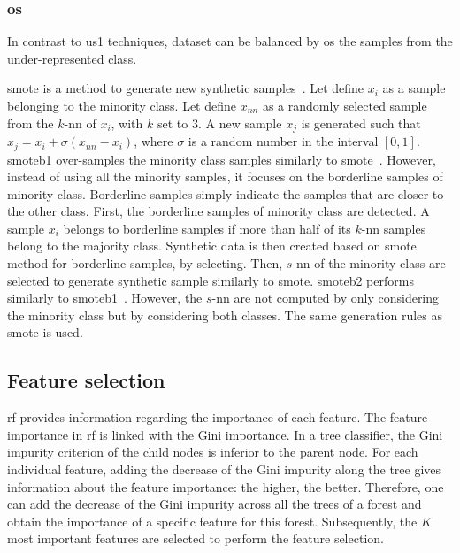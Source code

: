 \documentclass[a4paper,num-refs]{wiley-article}
\begin{document}
\subsubsection{\Acl*{os}}

In contrast to \ac{us1} techniques, dataset can be balanced by \ac{os} the
samples from the under-represented class.

\Ac{smote} is a method to generate new synthetic
samples~\cite{chawla2002smote}. Let define $x_i$ as a sample belonging to the
minority class. Let define $x_{nn}$ as a randomly selected sample from the
$k$-\ac{nn} of $x_i$, with $k$ set to 3. A new sample $x_j$ is generated such
that $x_j = x_i + \sigma \left( x_{nn} - x_i \right)$, where $\sigma$ is a
random number in the interval $\left[0,1\right]$. \Ac{smoteb1} over-samples the
minority class samples similarly to \ac{smote}~\cite{han2005borderline}.
However, instead of using all the minority samples, it focuses on the
borderline samples of minority class.  Borderline samples simply indicate the
samples that are closer to the other class. First, the borderline samples of
minority class are detected. A sample $x_{i}$ belongs to borderline samples if
more than half of its $k$-\ac{nn} samples belong to the majority
class. Synthetic data is then created based on \ac{smote} method for borderline
samples, by selecting. Then, $s$-\ac{nn} of the minority class are selected to
generate synthetic sample similarly to \ac{smote}. \Ac{smoteb2} performs
similarly to \ac{smoteb1}~\cite{han2005borderline}.  However, the $s$-\ac{nn}
are not computed by only considering the minority class but by considering both
classes. The same generation rules as \ac{smote} is used.

\subsection{Feature selection}

\Ac{rf} provides information regarding the importance of each feature. The
feature importance in \ac{rf} is linked with the Gini importance. In a tree
classifier, the Gini impurity criterion of the child nodes is inferior to the
parent node. For each individual feature, adding the decrease of the Gini
impurity along the tree gives information about the feature importance: the
higher, the better. Therefore, one can add the decrease of the Gini impurity
across all the trees of a forest and obtain the importance of a specific
feature for this forest. Subsequently, the $K$ most important features are
selected to perform the feature selection.
\end{document}
